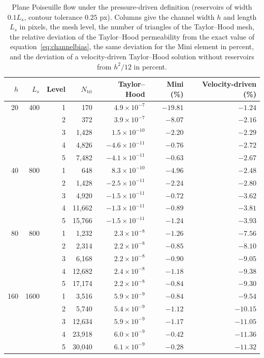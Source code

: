 \begin{table}[htbp]
\centering
\caption{Plane Poiseuille flow under the pressure-driven definition (reservoirs of width $0.1L_s$, contour tolerance $0.25$ px). Columns give the channel width $h$ and length $L_s$ in pixels, the mesh level, the number of triangles of the Taylor--Hood mesh, the relative deviation of the Taylor--Hood permeability from the exact value of equation~\eqref{eq:channelbias}, the same deviation for the Mini element in percent, and the deviation of a velocity-driven Taylor--Hood solution without reservoirs from $h^{2}/12$ in percent.}
\label{tab:poiseuilleP1}
\small
\begin{tabular}{rrrrrrr}
\toprule
$h$ & $L_s$ & Level & $N_{\mathrm{tri}}$ & Taylor--Hood & Mini (\%) & Velocity-driven (\%) \\
\midrule
20 & 400 & 1 & 170 & $4.9\times10^{-7}$ & $-19.81$ & $-1.24$ \\
 &  & 2 & 372 & $3.9\times10^{-7}$ & $-8.07$ & $-2.16$ \\
 &  & 3 & 1,428 & $1.5\times10^{-10}$ & $-2.20$ & $-2.29$ \\
 &  & 4 & 4,826 & $-4.6\times10^{-11}$ & $-0.76$ & $-2.72$ \\
 &  & 5 & 7,482 & $-4.1\times10^{-11}$ & $-0.63$ & $-2.67$ \\
\midrule
40 & 800 & 1 & 648 & $8.3\times10^{-10}$ & $-4.96$ & $-2.48$ \\
 &  & 2 & 1,428 & $-2.5\times10^{-11}$ & $-2.24$ & $-2.80$ \\
 &  & 3 & 4,920 & $-1.5\times10^{-11}$ & $-0.72$ & $-3.62$ \\
 &  & 4 & 11,662 & $-1.3\times10^{-11}$ & $-0.89$ & $-3.81$ \\
 &  & 5 & 15,766 & $-1.5\times10^{-11}$ & $-1.24$ & $-3.93$ \\
\midrule
80 & 800 & 1 & 1,232 & $2.3\times10^{-8}$ & $-1.26$ & $-7.56$ \\
 &  & 2 & 2,314 & $2.2\times10^{-8}$ & $-0.85$ & $-8.10$ \\
 &  & 3 & 6,168 & $2.2\times10^{-8}$ & $-0.90$ & $-9.05$ \\
 &  & 4 & 12,682 & $2.4\times10^{-8}$ & $-1.18$ & $-9.38$ \\
 &  & 5 & 17,174 & $2.2\times10^{-8}$ & $-0.84$ & $-9.30$ \\
\midrule
160 & 1600 & 1 & 3,516 & $5.9\times10^{-9}$ & $-0.84$ & $-9.54$ \\
 &  & 2 & 5,740 & $5.4\times10^{-9}$ & $-1.12$ & $-10.15$ \\
 &  & 3 & 12,634 & $5.9\times10^{-9}$ & $-1.17$ & $-11.05$ \\
 &  & 4 & 23,918 & $6.0\times10^{-9}$ & $-0.42$ & $-11.36$ \\
 &  & 5 & 30,040 & $6.1\times10^{-9}$ & $-0.28$ & $-11.32$ \\
\bottomrule
\end{tabular}
\end{table}
